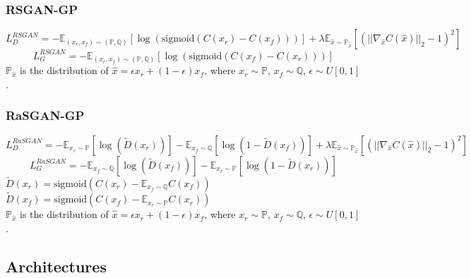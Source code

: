 \documentclass{article}
\begin{document}
\subsubsection{RSGAN-GP}

\begin{equation}
L_D^{RSGAN} = -\mathbb{E}_{(x_r,x_f) \sim (\mathbb{P},\mathbb{Q})}\left[ \log (\text{sigmoid}(C(x_r)-C(x_f))) \right] + \lambda \mathbb{E}_{\hat{x} \sim \mathbb{P}_{\hat{x}}} \left[ \left( || \nabla_{\hat{x}} C(\hat{x}) ||_2 - 1 \right)^2 \right]
\end{equation}
\begin{equation}
L_G^{RSGAN} = -\mathbb{E}_{(x_r,x_f) \sim (\mathbb{P},\mathbb{Q})}\left[ \log (\text{sigmoid}(C(x_f)-C(x_r))) \right]
\end{equation}
$\mathbb{P}_{\hat{x}}$ is the distribution of $\hat{x} = \epsilon x_r + (1-\epsilon) x_f$, where $x_r \sim \mathbb{P}$, $x_f \sim \mathbb{Q}$, $\epsilon \sim U[0,1]$.


\subsubsection{RaSGAN-GP}

\begin{equation}
L_D^{RaSGAN} = -\mathbb{E}_{x_r \sim \mathbb{P}}\left[ \log\left( \tilde{D}(x_r) \right) \right] - \mathbb{E}_{x_f \sim \mathbb{Q}} \left[ \log \left( 1 - \tilde{D}(x_f) \right) \right] + \lambda \mathbb{E}_{\hat{x} \sim \mathbb{P}_{\hat{x}}} \left[ \left( || \nabla_{\hat{x}} C(\hat{x}) ||_2 - 1 \right)^2 \right]
\end{equation} 
\begin{equation}
L_G^{RaSGAN} = -\mathbb{E}_{x_f \sim \mathbb{Q}}\left[ \log\left( \tilde{D}(x_f) \right) \right] - \mathbb{E}_{x_r \sim \mathbb{P}} \left[ \log \left( 1 - \tilde{D}(x_r) \right) \right]
\end{equation}
$\tilde{D}(x_r)=\text{sigmoid} \left( C(x_r)-\mathbb{E}_{x_f \sim \mathbb{Q}} C(x_f) \right)$ \\ $ \tilde{D}(x_f)=\text{sigmoid} \left( C(x_f)-\mathbb{E}_{x_r \sim \mathbb{P}} C(x_r) \right)$ \\
$\mathbb{P}_{\hat{x}}$ is the distribution of $\hat{x} = \epsilon x_r + (1-\epsilon) x_f$, where $x_r \sim \mathbb{P}$, $x_f \sim \mathbb{Q}$, $\epsilon \sim U[0,1]$.

\subsection{Architectures}
\end{document}
